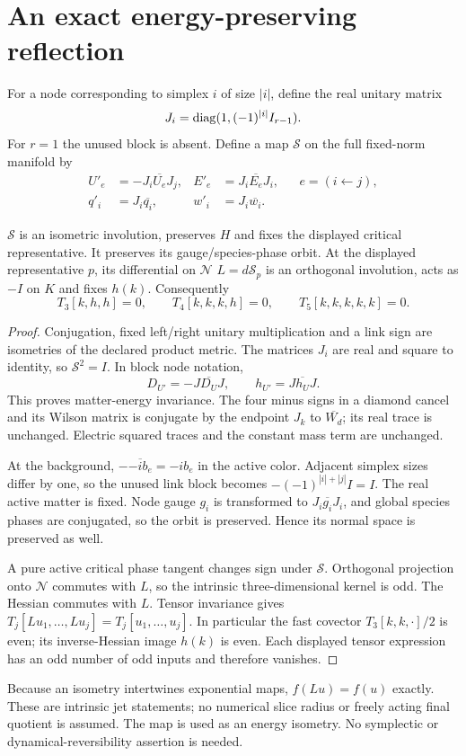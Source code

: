 \documentclass[11pt,a4paper]{article}
\begin{document}
\section{An exact energy-preserving reflection}
For a node corresponding to simplex $i$ of size $|i|$, define the real unitary matrix
\[
J_i=\operatorname{diag}(1,(-1)^{|i|}I_{r-1}).
\]
For $r=1$ the unused block is absent. Define a map $\mathcal S$ on the full fixed-norm manifold by
\begin{align*}
U'_e&=-J_i\overline{U_e}J_j,& E'_e&=J_i\overline{E_e}J_i,
&&e=(i\leftarrow j),\\
q'_i&=J_i\overline{q_i},&w'_i&=J_i\overline{w_i}.
\end{align*}
\begin{lemma}\label{lem:reflection}
$\mathcal S$ is an isometric involution, preserves $H$ and fixes the displayed critical representative. It preserves its gauge/species-phase orbit. At the displayed representative $p$, its differential on $\mathcal N$ $L=d\mathcal S_p$ is an orthogonal involution, acts as $-I$ on $K$ and fixes $h(k)$. Consequently
\[
T_3[k,h,h]=0,\qquad T_4[k,k,k,h]=0,\qquad T_5[k,k,k,k,k]=0.
\]
\end{lemma}
\begin{proof}
Conjugation, fixed left/right unitary multiplication and a link sign are isometries of the declared product metric. The matrices $J_i$ are real and square to identity, so $\mathcal S^2=I$. In block node notation,
\[
D_{U'}=-J\overline{D_U}J,\qquad h_{U'}=J\overline{h_U}J.
\]
This proves matter-energy invariance. The four minus signs in a diamond cancel and its Wilson matrix is conjugate by the endpoint $J_k$ to $\overline{W_d}$; its real trace is unchanged. Electric squared traces and the constant mass term are unchanged.

At the background, $-\overline{-ib_e}=-ib_e$ in the active color. Adjacent simplex sizes differ by one, so the unused link block becomes $-(-1)^{|i|+|j|}I=I$. The real active matter is fixed. Node gauge $g_i$ is transformed to $J_i\overline{g_i}J_i$, and global species phases are conjugated, so the orbit is preserved. Hence its normal space is preserved as well.

A pure active critical phase tangent changes sign under $\mathcal S$. Orthogonal projection onto $\mathcal N$ commutes with $L$, so the intrinsic three-dimensional kernel is odd. The Hessian commutes with $L$. Tensor invariance gives $T_j[Lu_1,\ldots,Lu_j]=T_j[u_1,\ldots,u_j]$. In particular the fast covector $T_3[k,k,\cdot]/2$ is even; its inverse-Hessian image $h(k)$ is even. Each displayed tensor expression has an odd number of odd inputs and therefore vanishes.
\end{proof}
Because an isometry intertwines exponential maps, $f(Lu)=f(u)$ exactly. These are intrinsic jet statements; no numerical slice radius or freely acting final quotient is assumed. The map is used as an energy isometry. No symplectic or dynamical-reversibility assertion is needed.
\newpage
\end{document}
